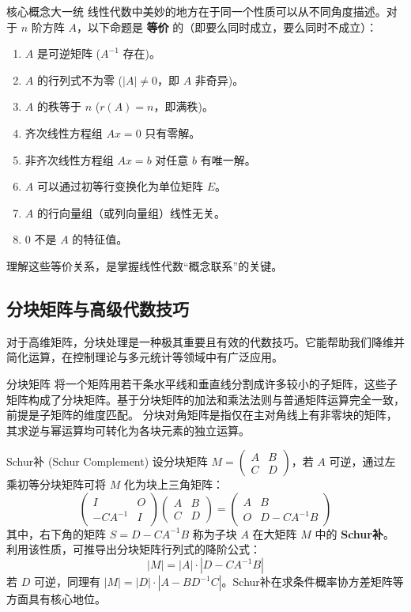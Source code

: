 \documentclass[a4paper,12pt]{ctexart}
\begin{document}
\begin{mythm}{核心概念大一统}{}
线性代数中美妙的地方在于同一个性质可以从不同角度描述。对于 $n$ 阶方阵 $A$，以下命题是 \textbf{等价} 的（即要么同时成立，要么同时不成立）：

\begin{enumerate}
    \item $A$ 是可逆矩阵 ($A^{-1}$ 存在)。
    \item $A$ 的行列式不为零 ($|A| \neq 0$，即 $A$ 非奇异)。
    \item $A$ 的秩等于 $n$ ($r(A) = n$，即满秩)。
    \item 齐次线性方程组 $Ax = 0$ 只有零解。
    \item 非齐次线性方程组 $Ax = b$ 对任意 $b$ 有唯一解。
    \item $A$ 可以通过初等行变换化为单位矩阵 $E$。
    \item $A$ 的行向量组（或列向量组）线性无关。
    \item $0$ 不是 $A$ 的特征值。
\end{enumerate}

理解这些等价关系，是掌握线性代数“概念联系”的关键。
\end{mythm}

\subsection{分块矩阵与高级代数技巧}

对于高维矩阵，分块处理是一种极其重要且有效的代数技巧。它能帮助我们降维并简化运算，在控制理论与多元统计等领域中有广泛应用。

\begin{mydef}{分块矩阵}{}
    将一个矩阵用若干条水平线和垂直线分割成许多较小的子矩阵，这些子矩阵构成了分块矩阵。基于分块矩阵的加法和乘法法则与普通矩阵运算完全一致，前提是子矩阵的维度匹配。
    分块对角矩阵是指仅在主对角线上有非零块的矩阵，其求逆与幂运算均可转化为各块元素的独立运算。
\end{mydef}

\newpage

\begin{mythm}{Schur补 (Schur Complement)}{}
    设分块矩阵 $M = \begin{pmatrix} A & B \\ C & D \end{pmatrix}$，若 $A$ 可逆，通过左乘初等分块矩阵可将 $M$ 化为块上三角矩阵：
    \[
    \begin{pmatrix} I & O \\ -CA^{-1} & I \end{pmatrix} \begin{pmatrix} A & B \\ C & D \end{pmatrix} = \begin{pmatrix} A & B \\ O & D - CA^{-1}B \end{pmatrix}
    \]
    其中，右下角的矩阵 $S = D - CA^{-1}B$ 称为子块 $A$ 在大矩阵 $M$ 中的 \textbf{Schur补}。
    利用该性质，可推导出分块矩阵行列式的降阶公式：
    \[
    |M| = |A| \cdot |D - CA^{-1}B|
    \]
    若 $D$ 可逆，同理有 $|M| = |D| \cdot |A - BD^{-1}C|$。Schur补在求条件概率协方差矩阵等方面具有核心地位。
\end{mythm}
\end{document}
